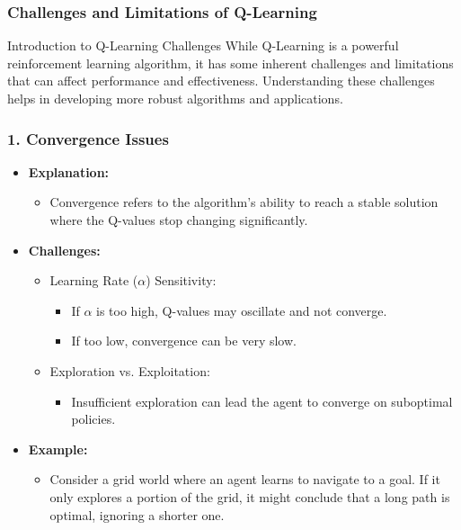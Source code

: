 \documentclass{beamer}
\begin{document}
\begin{frame}[fragile]
    \frametitle{Challenges and Limitations of Q-Learning}
    \begin{block}{Introduction to Q-Learning Challenges}
        While Q-Learning is a powerful reinforcement learning algorithm, it has some inherent challenges and limitations that can affect performance and effectiveness. Understanding these challenges helps in developing more robust algorithms and applications.
    \end{block}
\end{frame}

\begin{frame}[fragile]
    \frametitle{1. Convergence Issues}
    \begin{itemize}
        \item \textbf{Explanation:}
        \begin{itemize}
            \item Convergence refers to the algorithm's ability to reach a stable solution where the Q-values stop changing significantly.
        \end{itemize}
        \item \textbf{Challenges:}
        \begin{itemize}
            \item Learning Rate ($\alpha$) Sensitivity:
            \begin{itemize}
                \item If $\alpha$ is too high, Q-values may oscillate and not converge.
                \item If too low, convergence can be very slow.
            \end{itemize}
            \item Exploration vs. Exploitation:
            \begin{itemize}
                \item Insufficient exploration can lead the agent to converge on suboptimal policies.
            \end{itemize}
        \end{itemize}
        \item \textbf{Example:}
        \begin{itemize}
            \item Consider a grid world where an agent learns to navigate to a goal. If it only explores a portion of the grid, it might conclude that a long path is optimal, ignoring a shorter one.
        \end{itemize}
    \end{itemize}
\end{frame}
\end{document}
